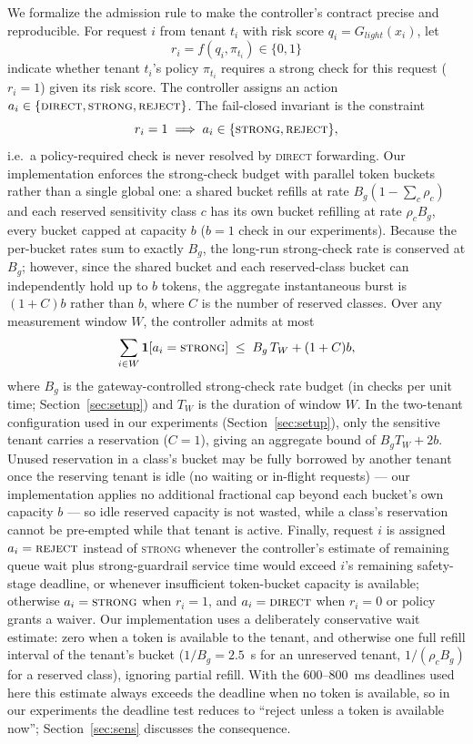 \documentclass[conference]{IEEEtran}
\newcommand{\Glight}{G_{\mathit{light}}}
\newcommand{\Bg}{B_g}
\newcommand{\DIRECT}{\textsc{direct}}
\newcommand{\STRONG}{\textsc{strong}}
\newcommand{\REJECT}{\textsc{reject}}
\begin{document}
We formalize the admission rule to make the controller's contract precise and reproducible. For request $i$ from tenant $t_i$ with risk score $q_i = \Glight(x_i)$, let
\begin{equation}
r_i = f(q_i, \pi_{t_i}) \in \{0, 1\}
\end{equation}
indicate whether tenant $t_i$'s policy $\pi_{t_i}$ requires a strong check for this request ($r_i = 1$) given its risk score. The controller assigns an action $a_i \in \{\DIRECT, \STRONG, \REJECT\}$. The fail-closed invariant is the constraint
\begin{equation}
r_i = 1 \implies a_i \in \{\STRONG, \REJECT\},
\end{equation}
i.e.\ a policy-required check is never resolved by \DIRECT{} forwarding. Our implementation enforces the strong-check budget with parallel token buckets rather than a single global one: a shared bucket refills at rate $\Bg(1 - \sum_c \rho_c)$ and each reserved sensitivity class $c$ has its own bucket refilling at rate $\rho_c \Bg$, every bucket capped at capacity $b$ ($b = 1$ check in our experiments). Because the per-bucket rates sum to exactly $\Bg$, the long-run strong-check rate is conserved at $\Bg$; however, since the shared bucket and each reserved-class bucket can independently hold up to $b$ tokens, the aggregate instantaneous burst is $(1+C)b$ rather than $b$, where $C$ is the number of reserved classes. Over any measurement window $W$, the controller admits at most
\begin{equation}
\sum_{i \in W} \mathbf{1}[a_i = \STRONG] \;\le\; \Bg\, T_W + (1+C)b,
\end{equation}
where $\Bg$ is the gateway-controlled strong-check rate budget (in checks per unit time; Section~\ref{sec:setup}) and $T_W$ is the duration of window $W$. In the two-tenant configuration used in our experiments (Section~\ref{sec:setup}), only the sensitive tenant carries a reservation ($C = 1$), giving an aggregate bound of $\Bg T_W + 2b$. Unused reservation in a class's bucket may be fully borrowed by another tenant once the reserving tenant is idle (no waiting or in-flight requests) --- our implementation applies no additional fractional cap beyond each bucket's own capacity $b$ --- so idle reserved capacity is not wasted, while a class's reservation cannot be pre-empted while that tenant is active. Finally, request $i$ is assigned $a_i = \REJECT$ instead of \STRONG{} whenever the controller's estimate of remaining queue wait plus strong-guardrail service time would exceed $i$'s remaining safety-stage deadline, or whenever insufficient token-bucket capacity is available; otherwise $a_i = \STRONG$ when $r_i = 1$, and $a_i = \DIRECT$ when $r_i = 0$ or policy grants a waiver. Our implementation uses a deliberately conservative wait estimate: zero when a token is available to the tenant, and otherwise one full refill interval of the tenant's bucket ($1/\Bg = 2.5$~s for an unreserved tenant, $1/(\rho_c\Bg)$ for a reserved class), ignoring partial refill. With the 600--800~ms deadlines used here this estimate always exceeds the deadline when no token is available, so in our experiments the deadline test reduces to ``reject unless a token is available now''; Section~\ref{sec:sens} discusses the consequence.
\end{document}
